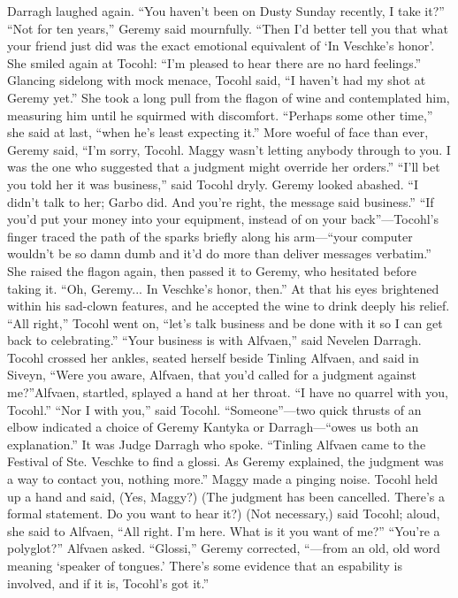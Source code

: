 \documentclass[9pt]{article}
\begin{document}
Darragh laughed again. “You haven’t been on Dusty Sunday recently, I take it?”
“Not for ten years,” Geremy said mournfully.
“Then I’d better tell you that what your friend just did was the exact emotional equivalent of ‘In
Veschke’s honor’. She smiled again at Tocohl: “I’m pleased to hear there are no hard feelings.”
Glancing sidelong with mock menace, Tocohl said, “I haven’t had my shot at Geremy yet.” She took
a long pull from the flagon of wine and contemplated him, measuring him until he squirmed with
discomfort. “Perhaps some other time,” she said at last, “when he’s least expecting it.”
More woeful of face than ever, Geremy said, “I’m sorry, Tocohl. Maggy wasn’t letting anybody
through to you. I was the one who suggested that a judgment might override her orders.”
“I’ll bet you told her it was business,” said Tocohl dryly.
Geremy looked abashed. “I didn’t talk to her; Garbo did. And you’re right, the message said
business.”
“If you’d put your money into your equipment, instead of on your back”—Tocohl’s finger traced the
path of the sparks briefly along his arm—“your computer wouldn’t be so damn dumb and it’d do more
than deliver messages verbatim.”
She raised the flagon again, then passed it to Geremy, who hesitated before taking it. “Oh,
Geremy... In Veschke’s honor, then.” At that his eyes brightened within his sad-clown features, and he
accepted the wine to drink deeply his relief. “All right,” Tocohl went on, “let’s talk business and be done
with it so I can get back to celebrating.”
“Your business is with Alfvaen,” said Nevelen Darragh.
Tocohl crossed her ankles, seated herself beside Tinling Alfvaen, and said in Siveyn, “Were you
aware, Alfvaen, that you’d called for a judgment against me?”Alfvaen, startled, splayed a hand at her throat. “I have no quarrel with you, Tocohl.”
“Nor I with you,” said Tocohl. “Someone”—two quick thrusts of an elbow indicated a choice of
Geremy Kantyka or Darragh—“owes us both an explanation.”
It was Judge Darragh who spoke. “Tinling Alfvaen came to the Festival of Ste. Veschke to find a
glossi. As Geremy explained, the judgment was a way to contact you, nothing more.”
Maggy made a pinging noise. Tocohl held up a hand and said, (Yes, Maggy?)
(The judgment has been cancelled. There’s a formal statement. Do you want to hear it?)
(Not necessary,) said Tocohl; aloud, she said to Alfvaen, “All right. I’m here. What is it you want of
me?”
“You’re a polyglot?” Alfvaen asked.
“Glossi,” Geremy corrected, “—from an old, old word meaning ‘speaker of tongues.’ There’s some
evidence that an espability is involved, and if it is, Tocohl’s got it.”
\end{document}
